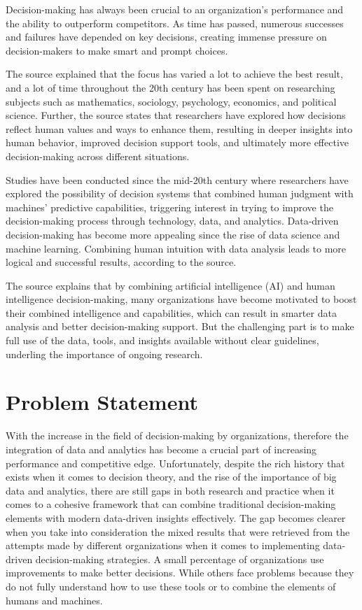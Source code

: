 Decision-making has always been crucial to an organization’s performance and the ability to outperform competitors.  As time has passed, numerous successes and failures have depended on key decisions, creating immense pressure on decision-makers to make smart and prompt choices.

The source explained that the focus has varied a lot to achieve the best result, and a lot of time throughout the 20th century has been spent on researching subjects such as mathematics, sociology, psychology, economics, and political science. Further, the source states that researchers have explored how decisions reflect human values and ways to enhance them, resulting in deeper insights into human behavior, improved decision support tools, and ultimately more effective decision-making across different situations.

Studies have been conducted since the mid-20th century where researchers have explored the possibility of decision systems that combined human judgment with machines’ predictive capabilities, triggering interest in trying to improve the decision-making process through technology, data, and analytics. Data-driven decision-making has become more appealing since the rise of data science and machine learning. Combining human intuition with data analysis leads to more logical and successful results, according to the source.

The source explains that by combining artificial intelligence (AI) and human intelligence decision-making, many organizations have become motivated to boost their combined intelligence and capabilities, which can result in smarter data analysis and better decision-making support. But the challenging part is to make full use of the data, tools, and insights available without clear guidelines, underling the importance of ongoing research. 

\section{Problem Statement}

With the increase in the field of decision-making by organizations, therefore the integration of data and analytics has become a crucial part of increasing performance and competitive edge. Unfortunately, despite the rich history that exists when it comes to decision theory, and the rise of the importance of big data and analytics, there are still gaps in both research and practice when it comes to a cohesive framework that can combine traditional decision-making elements with modern data-driven insights effectively. The gap becomes clearer when you take into consideration the mixed results that were retrieved from the attempts made by different organizations when it comes to implementing data-driven decision-making strategies. A small percentage of organizations use improvements to make better decisions. While others face problems because they do not fully understand how to use these tools or to combine the elements of humans and machines.

